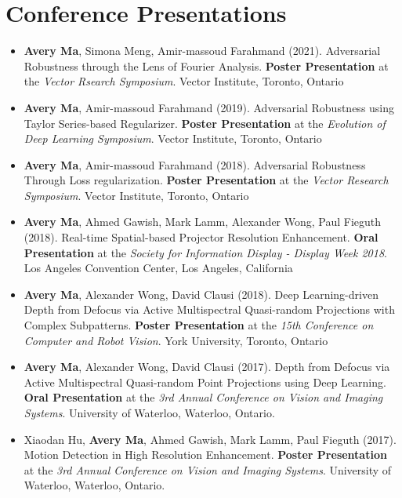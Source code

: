 \section*{Conference Presentations}
\vspace{\postsubhead}
\begin{adjustwidth}{\indentleft}{\indentright}
 \begin{itemize}
    \setlength\itemsep{0.5em}
    
    \item \textbf{Avery Ma}, Simona Meng, Amir-massoud Farahmand (2021). Adversarial Robustness through the Lens of Fourier Analysis. \textbf{Poster Presentation} at the \emph{Vector Rsearch Symposium}. Vector Institute, Toronto, Ontario
    
    \item \textbf{Avery Ma}, Amir-massoud Farahmand (2019). Adversarial Robustness using Taylor Series-based Regularizer. \textbf{Poster Presentation} at the \emph{Evolution of Deep Learning Symposium}. Vector Institute, Toronto, Ontario
    
    \item \textbf{Avery Ma}, Amir-massoud Farahmand (2018). Adversarial Robustness Through Loss regularization. \textbf{Poster Presentation} at the \emph{Vector Research Symposium}. Vector Institute, Toronto, Ontario
    
    \item \textbf{Avery Ma}, Ahmed Gawish, Mark Lamm, Alexander Wong, Paul Fieguth (2018). Real-time Spatial-based Projector Resolution Enhancement. \textbf{Oral Presentation} at the \emph{Society for Information Display - Display Week 2018}. Los Angeles Convention Center, Los Angeles, California
    
    \item \textbf{Avery Ma}, Alexander Wong, David Clausi (2018). Deep Learning-driven Depth from Defocus via Active Multispectral Quasi-random Projections with Complex Subpatterns. \textbf{Poster Presentation} at the \emph{15th Conference on Computer and Robot Vision}. York University, Toronto, Ontario
            
    \item \textbf{Avery Ma}, Alexander Wong, David Clausi (2017). Depth from Defocus via Active Multispectral Quasi-random Point Projections using Deep Learning. \textbf{Oral Presentation} at the \emph{3rd Annual Conference on Vision and Imaging Systems}. University of Waterloo, Waterloo, Ontario.
    
    \item Xiaodan Hu, \textbf{Avery Ma}, Ahmed Gawish, Mark Lamm, Paul Fieguth (2017). Motion Detection in High Resolution Enhancement. \textbf{Poster Presentation} at the \emph{3rd Annual Conference on Vision and Imaging Systems}. University of Waterloo, Waterloo, Ontario.
    

\end{itemize}
\end{adjustwidth}
